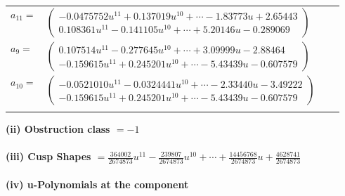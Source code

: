 \documentclass[1p]{elsarticle_modified}
\theoremstyle{definition}
\begin{document}
\begin{tabular}{m{7pt} m{180pt} m{7pt} m{180pt} }
\flushright $a_{11}=$&$\begin{pmatrix}-0.0475752 u^{11}+0.137019 u^{10}+\cdots-1.83773 u+2.65443\\0.108361 u^{11}-0.141105 u^{10}+\cdots+5.20146 u-0.289069\end{pmatrix}$ \\
\flushright $a_{9}=$&$\begin{pmatrix}0.107514 u^{11}-0.277645 u^{10}+\cdots+3.09999 u-2.88464\\-0.159615 u^{11}+0.245201 u^{10}+\cdots-5.43439 u-0.607579\end{pmatrix}$ \\
\flushright $a_{10}=$&$\begin{pmatrix}-0.0521010 u^{11}-0.0324441 u^{10}+\cdots-2.33440 u-3.49222\\-0.159615 u^{11}+0.245201 u^{10}+\cdots-5.43439 u-0.607579\end{pmatrix}$\\&\end{tabular}
\flushleft \textbf{(ii) Obstruction class $= -1$}\\~\\
\flushleft \textbf{(iii) Cusp Shapes $= \frac{364002}{2674873} u^{11}-\frac{239807}{2674873} u^{10}+\cdots+\frac{14456768}{2674873} u+\frac{4628741}{2674873}$}\\~\\
\newpage\renewcommand{\arraystretch}{1}
\flushleft \textbf{(iv) u-Polynomials at the component}\newline \\
\end{document}
